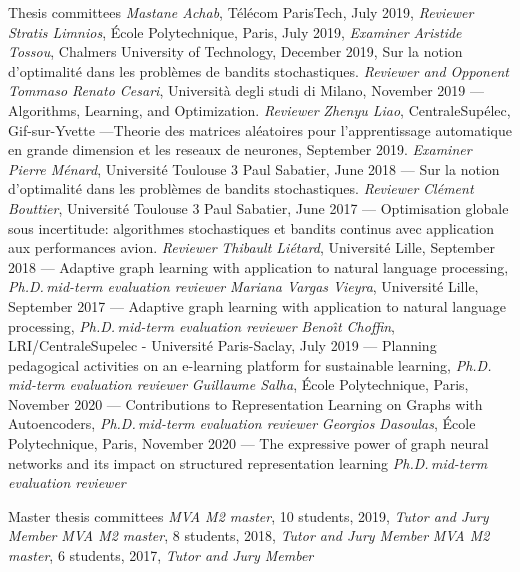 \documentclass{resume}
\begin{document}
\begin{category}{Thesis committees}
\citembullet \emph{Mastane Achab}, T\' el\'ecom ParisTech,  July 2019, \emph{Reviewer}
\citembullet \emph{Stratis Limnios},  \'Ecole Polytechnique, Paris, July 2019, \emph{Examiner}
\citembullet \emph{Aristide Tossou}, Chalmers University of Technology, December 2019, 
Sur la notion d'optimalit\'e dans les probl\`emes de bandits stochastiques. \emph{Reviewer and Opponent}
\citembullet \emph{Tommaso Renato Cesari}, Universit\`a degli studi di Milano, November 2019 --- 
Algorithms, Learning, and Optimization. \emph{Reviewer}
\citembullet \emph{Zhenyu Liao}, CentraleSup\'elec, Gif-sur-Yvette ---Theorie des matrices al\'eatoires pour l’apprentissage automatique en grande
dimension et les reseaux de neurones, September 2019. \emph{Examiner}
\citembullet \emph{Pierre M\'enard}, Universit\'e Toulouse 3 Paul Sabatier, June 2018 ---
Sur la notion d'optimalit\'e dans les probl\`emes de bandits stochastiques. \emph{Reviewer}
\citembullet \emph{Cl\'ement Bouttier}, Universit\'e Toulouse 3 Paul Sabatier, June 2017 ---
Optimisation globale sous incertitude: algorithmes stochastiques et
bandits continus avec application aux performances avion. 
\emph{Reviewer}
\citembullet \emph{Thibault Li\' etard}, Universit\'e Lille, September 2018 ---
Adaptive graph learning with application
to natural language processing,
\emph{Ph.D.\,mid-term evaluation reviewer}
\citembullet \emph{Mariana Vargas Vieyra}, Universit\'e Lille, September 2017 ---
Adaptive graph learning with application to natural language processing,
\emph{Ph.D.\,mid-term evaluation reviewer}
\citembullet \emph{Beno\^{ı}t Choffin}, LRI/CentraleSupelec - Universit\'e Paris-Saclay, July 2019  ---
Planning pedagogical activities on an e-learning platform for
sustainable learning,
\emph{Ph.D.\,mid-term evaluation reviewer}
\citembullet \emph{Guillaume Salha}, \'Ecole Polytechnique, Paris, November 2020  ---
Contributions to Representation Learning on Graphs with Autoencoders,
\emph{Ph.D.\,mid-term evaluation reviewer}
\citembullet \emph{Georgios Dasoulas}, \'Ecole Polytechnique, Paris, November 2020 ---
The expressive power of graph neural networks and its impact on structured representation learning
\emph{Ph.D.\,mid-term evaluation reviewer}
\end{category}

\begin{category}{Master thesis committees}
\citembullet \emph{MVA M2 master}, 10 students, 2019, \emph{Tutor and Jury Member}
\citembullet \emph{MVA M2 master}, 8 students, 2018, \emph{Tutor and Jury Member}
\citembullet \emph{MVA M2 master}, 6 students, 2017, \emph{Tutor and Jury Member}
\end{category}
\end{document}
